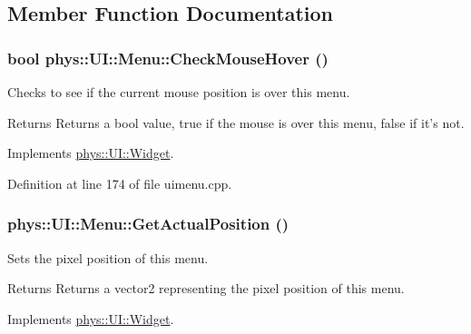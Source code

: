 \subsection{Member Function Documentation}
\hypertarget{classphys_1_1UI_1_1Menu_af2514d2614322856f604be2e167d0872}{
\subsubsection[{CheckMouseHover}]{\setlength{\rightskip}{0pt plus 5cm}bool phys::UI::Menu::CheckMouseHover ()}}
\label{d6/dd3/classphys_1_1UI_1_1Menu_af2514d2614322856f604be2e167d0872}


Checks to see if the current mouse position is over this menu. 

\begin{DoxyReturn}{Returns}
Returns a bool value, true if the mouse is over this menu, false if it's not. 
\end{DoxyReturn}


Implements \hyperlink{classphys_1_1UI_1_1Widget_a613df6dbb42efe139d185043a00259dc}{phys::UI::Widget}.



Definition at line 174 of file uimenu.cpp.

\hypertarget{classphys_1_1UI_1_1Menu_a74a1b8e9b1c5d36c12e5a0a7f813c40a}{
\subsubsection[{GetActualPosition}]{ phys::UI::Menu::GetActualPosition ()}}
\label{d6/dd3/classphys_1_1UI_1_1Menu_a74a1b8e9b1c5d36c12e5a0a7f813c40a}


Sets the pixel position of this menu. 

\begin{DoxyReturn}{Returns}
Returns a vector2 representing the pixel position of this menu. 
\end{DoxyReturn}


Implements \hyperlink{classphys_1_1UI_1_1Widget_a0a29fecff7f56d7909f65fd63b0990e7}{phys::UI::Widget}.



